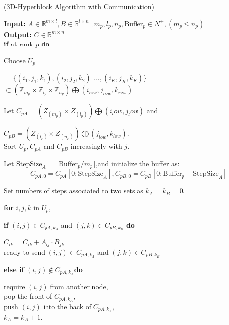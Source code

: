 \documentclass{amsart}
\theoremstyle{definition}
\theoremstyle{remark}
\numberwithin{equation}{section}
\begin{document}
\begin{algorithm}[h] 
\caption{(3D-Hyperblock Algorithm with Communication)}
\begin{adjustwidth}{0cm}{0cm} 
\textbf{Input:} $A\in \mathbb{R}^{m\times l},B\in \mathbb{R}^{l\times n}$
			$,m_p,l_p,n_p,\text{Buffer}_p\in N^+,(m_p\le n_p)$\\
\textbf{Output:} $C\in \mathbb{R}^{m\times n}$\\
\textbf{if} at rank $p$\textbf{ do}
\end{adjustwidth}
	\begin{adjustwidth}{1cm}{0cm}
	$\text{Choose }U_p$
	\begin{minipage}[t]{\linewidth}
	$=\{(i_1,j_1,k_1),(i_2,j_2,k_2),...,(i_K,j_K,k_K)\} $\\
	$\subset(\mathbb{Z}_{m_p}\times\mathbb{Z}_{l_p}\times\mathbb{Z}_{n_p})\bigoplus(i_{row},j_{row},k_{row})$
	\end{minipage}

	Let $C_{pA}=(Z_(m_p)\times Z_(l_p))\bigoplus(i_low,j_low)$ and
	\par $C_{pB}=(Z_(l_p)\times Z_(n_p))\bigoplus(j_{low},k_{low})$.\\
	Sort $U_p, C_{pA}$ and $C_{pB}$ increasingly with $j$.

	Let $\text{StepSize}_A$ = $\lfloor\text{Buffer}_p/m_p\rfloor$,and initialize the buffer as:
	\begin{equation*}
		C_{pA,0}=C_{pA}[0:\text{StepSize}_A],C_{pB,0}=C_{pB}[0:\text{Buffer}_p-\text{StepSize}_A]
	\end{equation*}
	
	Set numbers of steps associated to two sets as $k_A=k_B=0$.\\
	\par
	\textbf{for }$i,j,k$ in $U_p$,
		\begin{adjustwidth}{1cm}{0cm}
		\textbf{if }$(i,j)\in C_{pA,k_A}$ and $(j,k)\in C_{pB,k_B}$ \textbf{do}
			\begin{adjustwidth}{1cm}{0cm}
			$C_{ik}=C_{ik}+A_{ij}\cdot B_{jk}$\\
			ready to send $(i,j)\in C_{pA,k_A}$ and $(j,k)\in C_{pB,k_B}$
			\end{adjustwidth}

		\textbf{else if }$(i,j)\notin C_{pA,k_A}$\textbf{do}
			\begin{adjustwidth}{1cm}{0cm}
			require $(i,j)$ from another node,\\
			pop the front of $C_{pA,k_A}$,\\
			push $(i,j)$ into the back of $C_{pA,k_A}$,\\
			$k_A=k_A+1$.
			\end{adjustwidth}


\end{adjustwidth}
\end{adjustwidth}
\end{algorithm}
\end{document}
